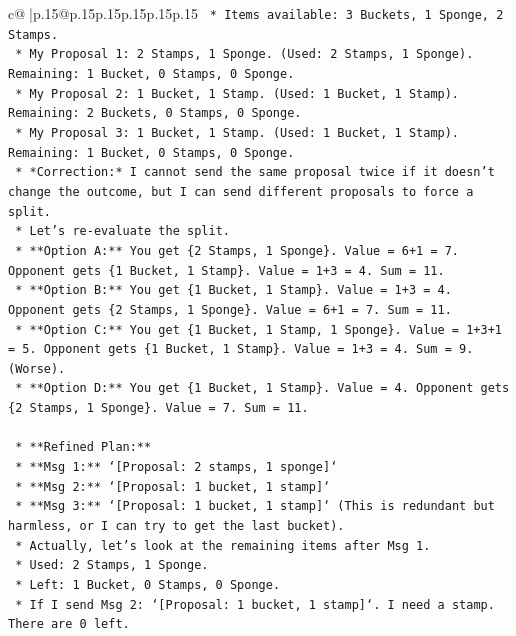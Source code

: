 \documentclass{article}
\begin{document}
{\begin{supertabular}{c@{$\;$}|p{.15\linewidth}@{}p{.15\linewidth}p{.15\linewidth}p{.15\linewidth}p{.15\linewidth}p{.15\linewidth}}
{{{\texttt{        *   Items available: 3 Buckets, 1 Sponge, 2 Stamps.} \\
\texttt{        *   My Proposal 1: 2 Stamps, 1 Sponge. (Used: 2 Stamps, 1 Sponge). Remaining: 1 Bucket, 0 Stamps, 0 Sponge.} \\
\texttt{        *   My Proposal 2: 1 Bucket, 1 Stamp. (Used: 1 Bucket, 1 Stamp). Remaining: 2 Buckets, 0 Stamps, 0 Sponge.} \\
\texttt{        *   My Proposal 3: 1 Bucket, 1 Stamp. (Used: 1 Bucket, 1 Stamp). Remaining: 1 Bucket, 0 Stamps, 0 Sponge.} \\
\texttt{        *   *Correction:* I cannot send the same proposal twice if it doesn't change the outcome, but I can send different proposals to force a split.} \\
\texttt{        *   Let's re{-}evaluate the split.} \\
\texttt{        *   **Option A:** You get \{2 Stamps, 1 Sponge\}. Value = 6+1 = 7. Opponent gets \{1 Bucket, 1 Stamp\}. Value = 1+3 = 4. Sum = 11.} \\
\texttt{        *   **Option B:** You get \{1 Bucket, 1 Stamp\}. Value = 1+3 = 4. Opponent gets \{2 Stamps, 1 Sponge\}. Value = 6+1 = 7. Sum = 11.} \\
\texttt{        *   **Option C:** You get \{1 Bucket, 1 Stamp, 1 Sponge\}. Value = 1+3+1 = 5. Opponent gets \{1 Bucket, 1 Stamp\}. Value = 1+3 = 4. Sum = 9. (Worse).} \\
\texttt{        *   **Option D:** You get \{1 Bucket, 1 Stamp\}. Value = 4. Opponent gets \{2 Stamps, 1 Sponge\}. Value = 7. Sum = 11.} \\
\\ 
\texttt{    *   **Refined Plan:**} \\
\texttt{        *   **Msg 1:** `{[}Proposal: 2 stamps, 1 sponge{]}`} \\
\texttt{        *   **Msg 2:** `{[}Proposal: 1 bucket, 1 stamp{]}`} \\
\texttt{        *   **Msg 3:** `{[}Proposal: 1 bucket, 1 stamp{]}` (This is redundant but harmless, or I can try to get the last bucket).} \\
\texttt{        *   Actually, let's look at the remaining items after Msg 1.} \\
\texttt{            *   Used: 2 Stamps, 1 Sponge.} \\
\texttt{            *   Left: 1 Bucket, 0 Stamps, 0 Sponge.} \\
\texttt{            *   If I send Msg 2: `{[}Proposal: 1 bucket, 1 stamp{]}`. I need a stamp. There are 0 left.} \\
}}}
\end{supertabular}}
\end{document}

